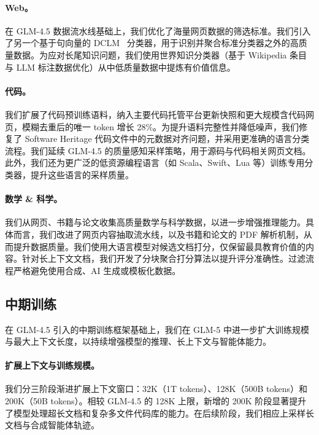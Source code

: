 \paragraph{Web。} 在 GLM-4.5 数据流水线基础上，我们优化了海量网页数据的筛选标准。我们引入了另一个基于句向量的 DCLM~\cite{li2025datacomplmsearchgenerationtraining} 分类器，用于识别并聚合标准分类器之外的高质量数据。为应对长尾知识问题，我们使用世界知识分类器（基于 Wikipedia 条目与 LLM 标注数据优化）从中低质量数据中提炼有价值信息。

\paragraph{代码。} 我们扩展了代码预训练语料，纳入主要代码托管平台更新快照和更大规模含代码网页，模糊去重后的唯一 token 增长 28\%。为提升语料完整性并降低噪声，我们修复了 Software Heritage 代码文件中的元数据对齐问题，并采用更准确的语言分类流程。我们延续 GLM-4.5 的质量感知采样策略，用于源码与代码相关网页文档。此外，我们还为更广泛的低资源编程语言（如 Scala、Swift、Lua 等）训练专用分类器，提升这些语言的采样质量。

\paragraph{数学 \& 科学。} 我们从网页、书籍与论文收集高质量数学与科学数据，以进一步增强推理能力。具体而言，我们改进了网页内容抽取流水线，以及书籍和论文的 PDF 解析机制，从而提升数据质量。我们使用大语言模型对候选文档打分，仅保留最具教育价值的内容。针对长上下文文档，我们开发了分块聚合打分算法以提升评分准确性。过滤流程严格避免使用合成、AI 生成或模板化数据。



\subsection{中期训练}

在 GLM-4.5 引入的中期训练框架基础上，我们在 GLM-5 中进一步扩大训练规模与最大上下文长度，以持续增强模型的推理、长上下文与智能体能力。

\paragraph{扩展上下文与训练规模。} 我们分三阶段渐进扩展上下文窗口：32K（1T tokens）、128K（500B tokens）和 200K（50B tokens）。相较 GLM-4.5 的 128K 上限，新增的 200K 阶段显著提升了模型处理超长文档和复杂多文件代码库的能力。在后续阶段，我们相应上采样长文档与合成智能体轨迹。


